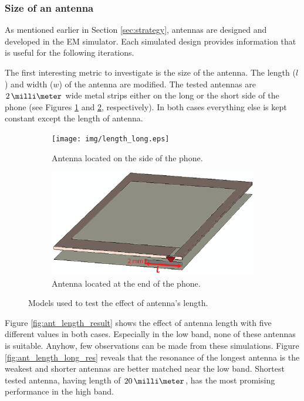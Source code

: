 \clearpage
\subsubsection{Size of an antenna}
\label{sec:antenna_size}
As mentioned earlier in Section \ref{sec:strategy}, antennas are designed and developed in the EM simulator. Each simulated design provides information that is useful for the following iterations. 

The first interesting metric to investigate is the size of the antenna. The length ($l$) and width ($w$) of the antenna are modified. The tested antennas are $2\,\milli\meter$ wide metal strips either on the long or the short side of the phone (see Figures \ref{fig:ant_length_long} and \ref{fig:ant_length_short}, respectively). In both cases everything else is kept constant except the length of antenna. 

\begin{figure}[H]
    \centering
    \begin{subfigure}[b]{0.49\textwidth}
        \texttt{[image: img/length\_long.eps]}
        \caption{Antenna located on the side of the phone.}
        \label{fig:ant_length_long}
    \end{subfigure}
    
    \begin{subfigure}[b]{0.49\textwidth}
        \includegraphics[width=\textwidth]{img/length_short.eps}
        \caption{Antenna located at the end of the phone.}
        \label{fig:ant_length_short}
    \end{subfigure}
    \caption{Models used to test the effect of antenna's length.}
    \label{fig:ant_length_model}
\end{figure}

Figure \ref{fig:ant_length_result} shows the effect of antenna length with five different values in both cases. Especially in the low band, none of these antennas is suitable. Anyhow, few observations can be made from these simulations. Figure \ref{fig:ant_length_long_res} reveals that the resonance of the longest antenna is the weakest and shorter antennas are better matched near the low band. Shortest tested antenna, having length of $20\,\milli\meter$, has the most promising performance in the high band.

